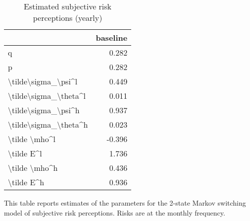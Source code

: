 
\begin{table}[p]
\centering
\begin{adjustbox}{width=0.3\textwidth}
\begin{threeparttable}
\caption{Estimated subjective risk perceptions (yearly)}
\label{tab:PRMarkovEst}\begin{tabular}{lr}
\toprule
{} &  baseline \\
\midrule
q                     &     0.282 \\
p                     &     0.282 \\
\textbackslash tilde\textbackslash sigma\_\textbackslash psi\textasciicircum l   &     0.449 \\
\textbackslash tilde\textbackslash sigma\_\textbackslash theta\textasciicircum l &     0.011 \\
\textbackslash tilde\textbackslash sigma\_\textbackslash psi\textasciicircum h   &     0.937 \\
\textbackslash tilde\textbackslash sigma\_\textbackslash theta\textasciicircum h &     0.023 \\
\textbackslash tilde \textbackslash mho\textasciicircum l         &    -0.396 \\
\textbackslash tilde E\textasciicircum l            &     1.736 \\
\textbackslash tilde \textbackslash mho\textasciicircum h         &     0.436 \\
\textbackslash tilde E\textasciicircum h            &     0.936 \\
\bottomrule
\end{tabular}
\begin{tablenotes}\item This table reports estimates of the parameters 
for the 2-state Markov switching model of subjective risk perceptions. Risks are at the monthly frequency. 
\end{tablenotes}
\end{threeparttable}
\end{adjustbox}
\end{table}
